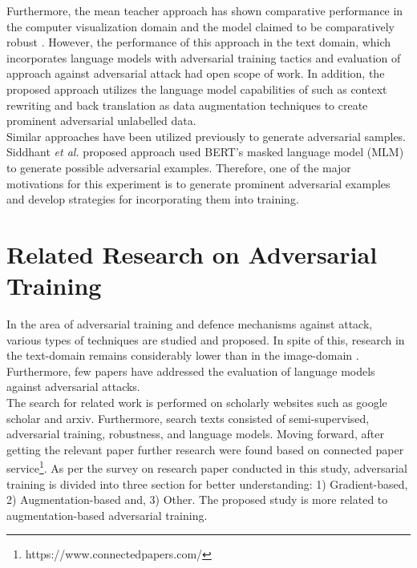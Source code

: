 \documentclass[%
	BCOR=8mm, %
	DIV=12,
	toc=bibliography, %
	toc=listof, %
	oneside, %
	egregdoesnotlikesansseriftitles, %
	]{scrbook}
\begin{document}
Furthermore, the mean teacher approach has shown comparative performance in the computer visualization domain and the model claimed to be comparatively robust \cite{tarvainen_mean_2018}. However, the performance of this approach in the text domain, which incorporates language models with adversarial training tactics  and evaluation of approach against adversarial attack had open scope of work. In addition, the proposed approach utilizes the language model capabilities of such as context rewriting and back translation as data augmentation techniques to create prominent adversarial unlabelled data. \\
Similar approaches have been utilized previously to generate adversarial samples. Siddhant \textit{et al.}  \cite{garg_bae_2020}  proposed approach used BERT's masked language model (MLM) to generate possible adversarial examples. Therefore, one of the major motivations for this experiment is to generate prominent adversarial examples and develop strategies for incorporating them into training.

\chapter{Related Research on Adversarial Training}
\label{chapter:relatedwork}
In the area of adversarial training and defence mechanisms against attack, various types of techniques are studied and proposed. In spite of this, research in the text-domain remains considerably lower than in the image-domain \cite{wang_towards_2021}. Furthermore, few papers have addressed the evaluation of language models against adversarial attacks.\\
The search for related work is performed on scholarly websites such as google scholar and arxiv. Furthermore, search texts consisted of semi-supervised, adversarial training, robustness, and language models. Moving forward,  after getting the relevant paper further research were found based on connected paper service\footnote{https://www.connectedpapers.com/}.
As per the survey on research paper conducted in this study, adversarial training is divided into three section for better understanding: 1) Gradient-based, 2) Augmentation-based and, 3) Other. The proposed study is more related to augmentation-based adversarial training.
\end{document}
